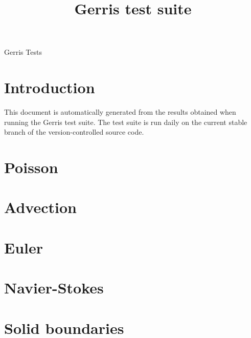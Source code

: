 \documentclass[a4paper]{article}
\title{Gerris test suite}
\begin{document}
\mbox{}\vspace{1cm}
\begin{center}
{\Huge Gerris Tests}\\
\vspace{1cm}

\vspace{5mm}
\end{center}

\section{Introduction}

This document is automatically generated from the results obtained
when running the Gerris test suite. The test suite is run daily on the
current stable branch of the version-controlled source code.

\section{Poisson}









\section{Advection}





\section{Euler}






\section{Navier-Stokes}






\section{Solid boundaries}
\end{document}
